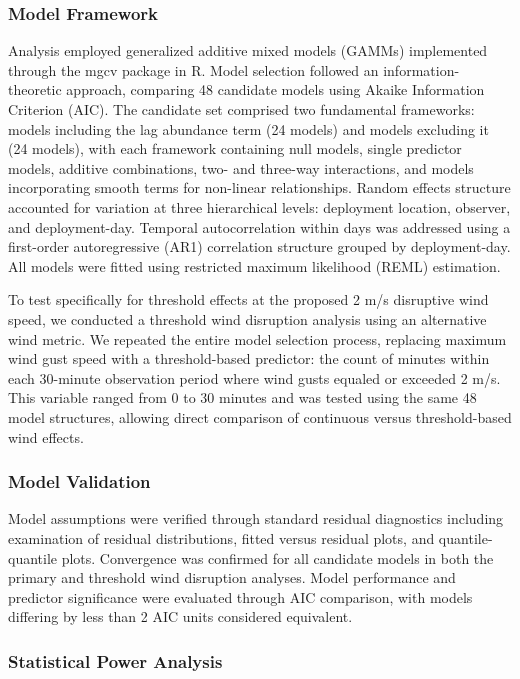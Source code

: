 \subsubsection{Model Framework}

Analysis employed generalized additive mixed models (GAMMs) implemented through the mgcv package in R. Model selection followed an information-theoretic approach, comparing 48 candidate models using Akaike Information Criterion (AIC). The candidate set comprised two fundamental frameworks: models including the lag abundance term (24 models) and models excluding it (24 models), with each framework containing null models, single predictor models, additive combinations, two- and three-way interactions, and models incorporating smooth terms for non-linear relationships. Random effects structure accounted for variation at three hierarchical levels: deployment location, observer, and deployment-day. Temporal autocorrelation within days was addressed using a first-order autoregressive (AR1) correlation structure grouped by deployment-day. All models were fitted using restricted maximum likelihood (REML) estimation.

To test specifically for threshold effects at the proposed 2 m/s disruptive wind speed, we conducted a threshold wind disruption analysis using an alternative wind metric. We repeated the entire model selection process, replacing maximum wind gust speed with a threshold-based predictor: the count of minutes within each 30-minute observation period where wind gusts equaled or exceeded 2 m/s. This variable ranged from 0 to 30 minutes and was tested using the same 48 model structures, allowing direct comparison of continuous versus threshold-based wind effects.

\subsubsection{Model Validation}

Model assumptions were verified through standard residual diagnostics including examination of residual distributions, fitted versus residual plots, and quantile-quantile plots. Convergence was confirmed for all candidate models in both the primary and threshold wind disruption analyses. Model performance and predictor significance were evaluated through AIC comparison, with models differing by less than 2 AIC units considered equivalent.

\subsubsection{Statistical Power Analysis}

